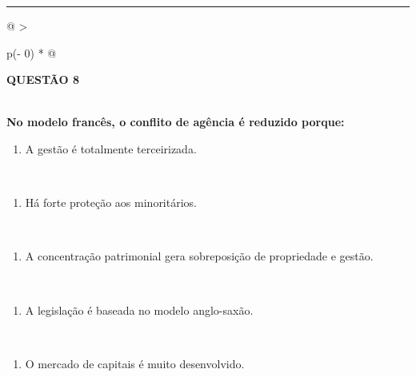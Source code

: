 \documentclass[
]{book}
\providecommand{\tightlist}{%
  \setlength{\itemsep}{0pt}\setlength{\parskip}{0pt}}
\begin{document}
\begin{center}\rule{0.5\linewidth}{0.5pt}\end{center}

\begin{longtable}[]{@{}
  >{\raggedright\arraybackslash}p{(\columnwidth - 0\tabcolsep) * }@{}}
\toprule\noalign{}
\begin{minipage}[b]{\linewidth}\raggedright
\textbf{QUESTÃO 8}
\end{minipage} \\
\midrule\noalign{}
\endhead
\bottomrule\noalign{}
\endlastfoot
\textbf{No modelo francês, o conflito de agência é reduzido porque:} \\
\begin{minipage}[t]{\linewidth}\raggedright
\begin{enumerate}
\def\labelenumi{\alph{enumi})}
\tightlist
\item
  A gestão é totalmente terceirizada.
\end{enumerate}
\end{minipage} \\
\begin{minipage}[t]{\linewidth}\raggedright
\begin{enumerate}
\def\labelenumi{\alph{enumi})}
\setcounter{enumi}{1}
\tightlist
\item
  Há forte proteção aos minoritários.
\end{enumerate}
\end{minipage} \\
\begin{minipage}[t]{\linewidth}\raggedright
\begin{enumerate}
\def\labelenumi{\alph{enumi})}
\setcounter{enumi}{2}
\tightlist
\item
  A concentração patrimonial gera sobreposição de propriedade e gestão.
\end{enumerate}
\end{minipage} \\
\begin{minipage}[t]{\linewidth}\raggedright
\begin{enumerate}
\def\labelenumi{\alph{enumi})}
\setcounter{enumi}{3}
\tightlist
\item
  A legislação é baseada no modelo anglo-saxão.
\end{enumerate}
\end{minipage} \\
\begin{minipage}[t]{\linewidth}\raggedright
\begin{enumerate}
\def\labelenumi{\alph{enumi})}
\setcounter{enumi}{4}
\tightlist
\item
  O mercado de capitais é muito desenvolvido.
\end{enumerate}
\end{minipage} \\
 \\
\end{longtable}
\end{document}
